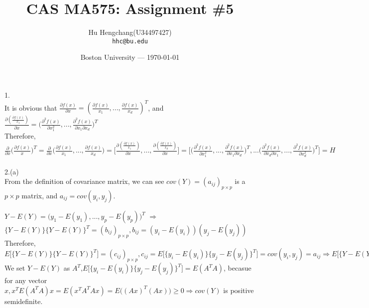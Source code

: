 \documentclass[fleqn]{article}
\title{CAS MA575: Assignment \#5} %
\author{Hu Hengchang(U34497427)\\ \texttt{hhc@bu.edu}} %
\date{Boston University --- \today} %
\begin{document}
\maketitle %




1.\\

It is obvious that $\frac{\partial f(x)}{\partial x} = (\frac{\partial f(x)}{x_1},..., \frac{\partial f(x)}{x_d})^T$, and $\frac{\partial (\frac{\partial f(x)}{x_1})}{\partial x} = \big(\frac{\partial^2 f(x)}{\partial x_1^2},..., \frac{\partial^2 f(x)}{\partial x_1 \partial x_d}\big)^T$\\

Therefore, $\frac{\partial }{\partial x} \Big(\frac{\partial f(x)}{x}\Big)^T = \frac{\partial }{\partial x} \Big(\frac{\partial f(x)}{x_1},..., \frac{\partial f(x)}{x_d}\Big) = \big[\frac{\partial (\frac{\partial f(x)}{x_1})}{\partial x},...,\frac{\partial (\frac{\partial f(x)}{x_d})}{\partial x} \big] = \big[\big(\frac{\partial^2 f(x)}{\partial x_1^2},..., \frac{\partial^2 f(x)}{\partial x_1 \partial x_d}\big)^T,...\big(\frac{\partial^2 f(x)}{\partial x_d \partial x_1},..., \frac{\partial^2 f(x)}{\partial x_d^2}\big)^T\big] = H$\\
\\



2.(a)\\

From the definition of covariance matrix, we can see $cov(Y) = (a_{ij})_{p \times p}$ is a $p \times p$ matrix, and $a_{ij} = cov(y_i, y_j)$.

$Y - E(Y) = \Big(y_1 - E(y_1),...,y_p - E(y_p)\Big)^T$ $\Rightarrow$ $\{Y - E(Y)\}  \{Y - E(Y)\}^T = (b_{ij})_{p \times p}, b_{ij} = (y_i - E(y_i))(y_j - E(y_j))$\\

Therefore, $E\big[\{Y - E(Y)\}  \{Y - E(Y)\}^T\big] = (c_{ij})_{p \times p}, c_{ij} = E\big[\{y_i - E(y_i)\}  \{y_j - E(y_j)\}^T\big] = cov(y_i, y_j) = a_{ij} \Rightarrow E\big[\{Y - E(Y)\}  \{Y - E(Y)\}^T\big] = cov(Y)$\\

We set $Y - E(Y)$ as $A^T$,$ E\big[\{y_i - E(y_i)\}  \{y_j - E(y_j)\}^T\big] = E(A^T A)$, becasue for any vector $x, x^T E(A^T A) x = E(x^T A^T A x) = E\big((Ax)^T (Ax)\big) \geq 0 \Rightarrow cov(Y)$ is positive semidefinite. \\
\end{document}
